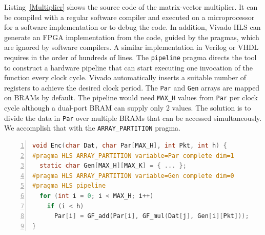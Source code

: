 Listing~\ref{Multiplier} shows the source code of the
matrix-vector multiplier. %
It can be compiled with a regular software
compiler and executed on a microprocessor
for a software implementation or to debug the code.
In addition, Vivado HLS can generate an FPGA implementation
from the code, guided by the pragmas, which are ignored by software compilers.
A similar implementation in Verilog or VHDL requires in the order of hundreds
of lines.  The {\tt pipeline} pragma directs the tool to construct a
hardware pipeline that can start executing one invocation of the function
every clock cycle.  Vivado automatically inserts a suitable number of registers
to achieve the desired clock period.
The {\tt Par} and {\tt Gen} arrays are mapped
on BRAMs by default.  The pipeline would need {\tt MAX\_H} values from {\tt Par}
per clock cycle although a dual-port BRAM can supply only 2 values.  The
solution is to divide the data in {\tt Par} over multiple BRAMs that can be
accessed simultaneously.  We accomplish that with the {\tt ARRAY\_PARTITION}
pragma.

\begin{lstlisting}[language=C,basicstyle=\footnotesize,numbers=left,
                   captionpos=b,caption={Matrix-Vector Multiplier},
                   label=Multiplier]
void Enc(char Dat, char Par[MAX_H], int Pkt, int h) {
#pragma HLS ARRAY_PARTITION variable=Par complete dim=1
  static char Gen[MAX_H][MAX_K] = { ... };
#pragma HLS ARRAY_PARTITION variable=Gen complete dim=0
#pragma HLS pipeline
  for (int i = 0; i < MAX_H; i++)
    if (i < h)
      Par[i] = GF_add(Par[i], GF_mul(Dat[j], Gen[i][Pkt]));
}
\end{lstlisting}

